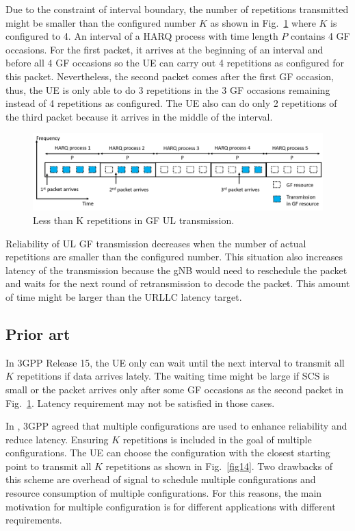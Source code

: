\documentclass{ieeeaccess}
\begin{document}
Due to the constraint of interval boundary, the number of repetitions transmitted might be smaller than the configured number $K$ as shown in Fig.~\ref{fig4} where $K$ is configured to 4. An interval of a HARQ process with time length $P$ contains 4 GF occasions. For the first packet, it arrives at the beginning of an interval and before all 4 GF occasions so the UE can carry out 4 repetitions as configured for this packet. Nevertheless, the second packet comes after the first GF occasion, thus, the UE is only able to do 3 repetitions in the 3 GF occasions remaining instead of 4 repetitions as configured. The UE also can do only 2 repetitions of the third packet because it arrives in the middle of the interval. 

\begin{figure}[htbp]
\centerline{\includegraphics[scale=0.27]{fig4.png}}
\caption{Less than K repetitions in GF UL transmission.}
\label{fig4}
\vspace{-3mm}
\end{figure}

Reliability of UL GF transmission decreases when the number of actual repetitions are smaller than the configured number. This situation also increases latency of the transmission because the gNB would need to reschedule the packet and waits for the next round of retransmission to decode the packet. This amount of time might be larger than the URLLC latency target.

\subsection{Prior art}\label{IIIBN}
In 3GPP Release 15, the UE only can wait until the next interval to transmit all $K$ repetitions if data arrives lately. The waiting time might be large if SCS is small or the packet arrives only after some GF occasions as the second packet in Fig.~\ref{fig4}. Latency requirement may not be satisfied in those cases.

In \cite{ref7}, 3GPP agreed that multiple configurations are used to enhance reliability and reduce latency. Ensuring $K$ repetitions is included in the goal of multiple configurations. The UE can choose the configuration with the closest starting point to transmit all $K$ repetitions as shown in Fig.~\ref{fig14}. Two drawbacks of this scheme are overhead of signal to schedule multiple configurations and resource consumption of multiple configurations. For this reasons, the main motivation for multiple configuration is for different applications with different requirements.
\end{document}
